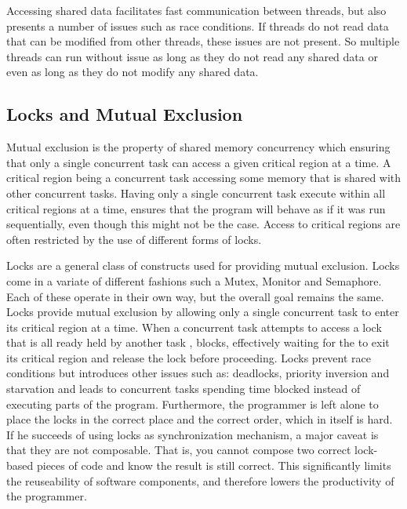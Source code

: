 Accessing shared data facilitates fast communication between threads, but also presents a number of issues such as race conditions. If threads do not read data that can be modified from other threads, these issues are not present. So multiple threads can run without issue as long as they do not read any shared data or even as long as they do not modify any shared data.


\subsection{Locks and Mutual Exclusion}
Mutual exclusion is the property of shared memory concurrency which ensuring that only a single concurrent task can access a given critical region at a time\cite[p. 117]{tanenbaum2008modern}\cite[p. 962]{bryant2011computer}. A critical region being a concurrent task accessing some memory that is shared with other concurrent tasks\cite[p. 117]{tanenbaum2008modern}\cite[p. 961]{bryant2011computer}. Having only a single concurrent task execute within all critical regions at a time, ensures that the program will behave as if it was run sequentially, even though this might not be the case. Access to critical regions are often restricted by the use of different forms of locks. 

Locks are a general class of constructs used for providing mutual exclusion. Locks come in a variate of different fashions such a Mutex, Monitor and Semaphore. Each of these operate in their own way, but the overall goal remains the same. Locks provide mutual exclusion by allowing only a single concurrent task to enter its critical region at a time. When a concurrent task  attempts to access a lock that is all ready held by another task , blocks, effectively waiting for the  to exit its critical region and release the lock before proceeding. Locks prevent race conditions but introduces other issues such as: deadlocks, priority inversion and starvation and leads to concurrent tasks spending time blocked instead of executing parts of the program. Furthermore, the programmer is left alone to place the locks in the correct place and the correct order, which in itself is hard. If he succeeds of using locks as synchronization mechanism, a major caveat is that they are not composable\cite[p. 58]{sutter2005software}. That is, you cannot compose two correct lock-based pieces of code and know the result is still correct. This significantly limits the reuseability of software components, and therefore lowers the productivity of the programmer.

